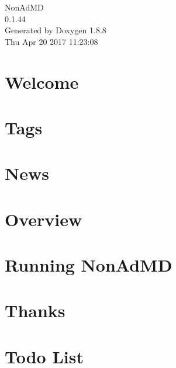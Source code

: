 \documentclass[twoside]{book}
\newcommand{\+}{\discretionary{\mbox{\scriptsize$\hookleftarrow$}}{}{}}
\newcommand{\clearemptydoublepage}{%
  \newpage{\pagestyle{empty}\cleardoublepage}%
}
\begin{document}
\hypersetup{pageanchor=false,
             bookmarks=true,
             bookmarksnumbered=true,
             pdfencoding=unicode
            }
\begin{titlepage}
\vspace*{7cm}
\begin{center}%
{\Large Non\+Ad\+M\+D \\[1ex]\large 0.\+1.\+44 }\\
\vspace*{1cm}
{\large Generated by Doxygen 1.8.8}\\
\vspace*{0.5cm}
{\small Thu Apr 20 2017 11:23:08}\\
\end{center}
\end{titlepage}
\clearemptydoublepage
\tableofcontents
\clearemptydoublepage
{}
\hypersetup{pageanchor=true}

\chapter{Welcome}
\label{index}\hypertarget{index}{}
\chapter{Tags}
\label{_tags}
\hypertarget{_tags}{}

\chapter{News}
\label{_news}
\hypertarget{_news}{}

\chapter{Overview}
\label{_overview}
\hypertarget{_overview}{}

\chapter{Running Non\+Ad\+M\+D}
\label{_interface}
\hypertarget{_interface}{}

\chapter{Thanks}
\label{_thanks}
\hypertarget{_thanks}{}

\chapter{Todo List}
\label{todo}
\hypertarget{todo}{}

\end{document}
